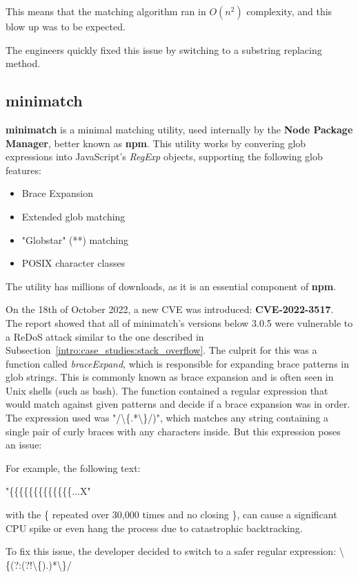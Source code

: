This means that the matching algorithm ran in $O(n^2)$ complexity, and this blow up was to be expected.

The engineers quickly fixed this issue by switching to a substring replacing method.

\subsection{minimatch}
\textbf{minimatch} is a minimal matching utility, used internally by the \textbf{Node Package Manager}, better known as \textbf{npm}. \cite{npm_minimatch}
This utility works by convering glob expressions into JavaScript's \textit{RegExp} objects, supporting the following glob features:
\begin{itemize}
	\item Brace Expansion
	\item Extended glob matching
	\item "Globstar" (**) matching
	\item POSIX character classes
\end{itemize}
The utility has millions of downloads, as it is an essential component of \textbf{npm}.

On the 18th of October 2022, a new CVE was introduced: \textbf{CVE-2022-3517}.
The report showed that all of minimatch's versions below 3.0.5 were vulnerable to a ReDoS attack similar to the one described in Subsection~\ref{intro:case_studies:stack_overflow}.
The culprit for this was a function called \textit{braceExpand}, which is responsible for expanding brace patterns in glob strings. This is commonly known as brace expansion and is often seen in Unix shells (such as bash). 
The function contained a regular expression that would match against given patterns and decide if a brace expansion was in order. The expression used was "/\textbackslash\{.*\textbackslash\}/)", which matches any string containing a single pair of curly braces with any characters inside. But this expression poses an issue:

For example, the following text:
\begin{center}
	"\{\{\{\{\{\{\{\{\{\{\{\{\{...X"
\end{center}

with the \{ repeated over 30,000 times and no closing \}, can cause a significant CPU spike or even hang the process due to catastrophic backtracking.

To fix this issue, the developer decided to switch to a safer regular expression: \textbackslash\{(?:(?!\textbackslash\{).)*\textbackslash\}/


